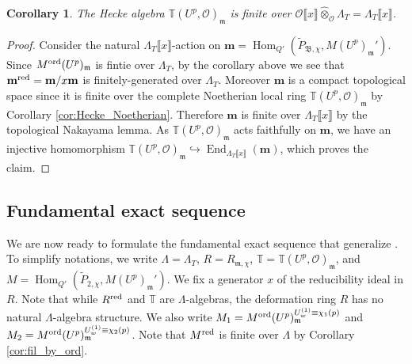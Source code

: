 \documentclass[leqno]{amsart}
\newcommand{\TT}{\mathbb{T}} %
\newcommand{\B}{\mathfrak B}
\newcommand{\red}{\textnormal{red}}
\newcommand{\ord}{\textnormal{ord}}
\newcommand{\oo}{\mathcal{O}} %
\newcommand{\fm}{\mathfrak{m}}
\DeclareMathOperator{\End}{End}
\DeclareMathOperator{\Hom}{Hom}
\newtheorem{cor}[thm]{Corollary}
\theoremstyle{definition}
\theoremstyle{remark}
\begin{document}
\begin{cor}\label{cor:Hecke_finite}
The Hecke algebra 
$\TT(U^p,\oo)_{\fm}$ 
is finite over
$\oo\llbracket x\rrbracket \hat{\otimes}_{\oo}\Lambda_T
=\Lambda_T\llbracket x\rrbracket$.
\end{cor}
\begin{proof}
	Consider the natural
	$\Lambda_T\llbracket x\rrbracket$-action on
	$\mathbf{m}=\Hom_{Q'}(\tilde{P}_{\B,\chi},
	M(U^p)_{\fm}')$.
	Since $M^{\ord}(U^p)_{\fm}$ 
	is fintie over $\Lambda_T$,
	by the corollary above 
	we see that 
	$\mathbf{m}^{\red}=\mathbf{m}/x\mathbf{m}$ 
	is finitely-generated over $\Lambda_T$.
	Moreover $\mathbf{m}$ is a compact 
	topological space 
	since it is finite over  
	the complete Noetherian local ring 
	$\TT(U^p,\oo)_{\fm}$ 
	by Corollary \ref{cor:Hecke_Noetherian}.
	Therefore $\mathbf{m}$
	is finite over $\Lambda_T\llbracket x\rrbracket$
	by the topological Nakayama lemma.
	As $\TT(U^p,\oo)_{\fm}$ acts faithfully
	on $\mathbf{m}$,
	we have an injective homomorphism
	$\TT(U^p,\oo)_{\fm}\hookrightarrow 
	\End_{\Lambda_T\llbracket x\rrbracket}(\mathbf{m})$,
	which proves the claim.
\end{proof}


\subsection{Fundamental exact sequence}
\label{sub:fund_exact_sequence}

We are now ready to 
formulate the fundamental
exact sequence 
that generalize \cite[Prop 6.3.5]{urban}.
To simplify notations,
we write 
$\Lambda=\Lambda_T$,
$R=R_{\fm,\chi}$,
$\TT=\TT(U^p,\oo)_{\fm}$, and
$M=\Hom_{Q'}(\tilde{P}_{2,\chi},M(U^p)_{\fm}')$.
We fix a generator $x$ of the reducibility
ideal in $R$.
Note that 
while $R^{\red}$ and $\TT$
are  $\Lambda$-algebras,
the deformation ring $R$ 
has no natural $\Lambda$-algebra structure.
We also write
$M_1=M^{\ord}(U^p)_{\fm}^{U_{w}^{(1)}\equiv \chi_1(p)}$
and
$M_2=M^{\ord}(U^p)_{\fm}^{U_{w}^{(1)}\equiv \chi_2(p)}$.
Note that $M^{\red}$ is finite over $\Lambda$
by Corollary \ref{cor:fil_by_ord}.
\end{document}
